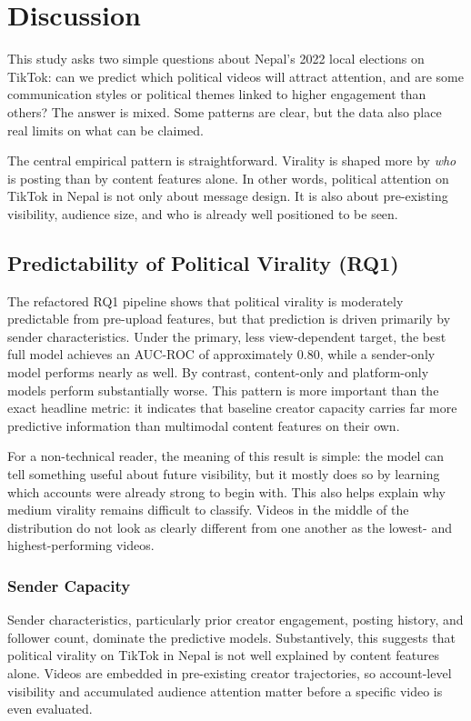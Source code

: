 \documentclass[12pt,a4paper]{report}
\begin{document}
\chapter{Discussion}
\label{chap:discussion}

This study asks two simple questions about Nepal’s 2022 local elections on TikTok: can we predict which political videos will attract attention, and are some communication styles or political themes linked to higher engagement than others? The answer is mixed. Some patterns are clear, but the data also place real limits on what can be claimed.

The central empirical pattern is straightforward. Virality is shaped more by \textit{who} is posting than by content features alone. In other words, political attention on TikTok in Nepal is not only about message design. It is also about pre-existing visibility, audience size, and who is already well positioned to be seen.

\section{Predictability of Political Virality (RQ1)}
\label{sec:rq1_discussion}
The refactored RQ1 pipeline shows that political virality is moderately predictable from pre-upload features, but that prediction is driven primarily by sender characteristics. Under the primary, less view-dependent target, the best full model achieves an AUC-ROC of approximately 0.80, while a sender-only model performs nearly as well. By contrast, content-only and platform-only models perform substantially worse. This pattern is more important than the exact headline metric: it indicates that baseline creator capacity carries far more predictive information than multimodal content features on their own.

For a non-technical reader, the meaning of this result is simple: the model can tell something useful about future visibility, but it mostly does so by learning which accounts were already strong to begin with. This also helps explain why medium virality remains difficult to classify. Videos in the middle of the distribution do not look as clearly different from one another as the lowest- and highest-performing videos.

\subsection{Sender Capacity}

Sender characteristics, particularly prior creator engagement, posting history, and follower count, dominate the predictive models. Substantively, this suggests that political virality on TikTok in Nepal is not well explained by content features alone. Videos are embedded in pre-existing creator trajectories, so account-level visibility and accumulated audience attention matter before a specific video is even evaluated.
\end{document}
